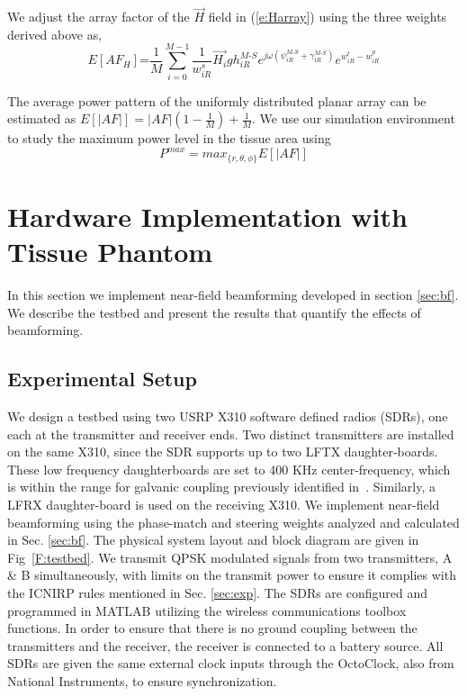 We adjust the array factor of the $\overrightarrow{H}$ field in (\ref{e:Harray}) using the three weights derived above as, 
\begin{equation}\label{e:AFnew}
E[AF_H]\text{=}\frac{1}{M}\sum_{i=0}^{M-1} \frac{1}{w_{iR}^s} \overrightarrow{H_i}gh_{iR}^{M\text{-}S} e^{j\omega \left(\psi_{iR}^{M\text{-}S}+\gamma_{iR}^{M\text{-}S} \right)} e^{w^{t}_{iR} - w_{iR}^p}
\end{equation}

The average power pattern of the uniformly distributed planar array can be estimated as $E[|AF|] = |AF|(1-\frac{1}{M})+\frac{1}{M}$. 
We use our simulation environment to study the maximum power level in the tissue area using 
\begin{equation}\label{e:Pmax}
P^{max}=max_{\{r,\theta,\phi\}}  E[|AF|]
\end{equation}

\section{Hardware Implementation with Tissue Phantom}
\label{sec:implement}
In this section we implement near-field beamforming developed in section \ref{sec:bf}. We describe the testbed and present the results that quantify the effects of beamforming. 
\subsection{Experimental Setup}

We design a testbed using two USRP X310 software defined radios (SDRs), one each at the transmitter and receiver ends. Two distinct transmitters are installed on the same X310, since the SDR supports up to two LFTX daughter-boards. These low frequency daughterboards are set to 400 KHz center-frequency, which is within the range for galvanic coupling previously identified in~\cite{tbiocas}. Similarly, a LFRX daughter-board is used on the receiving X310. We implement near-field beamforming using the phase-match and steering weights analyzed and calculated in Sec. \ref{sec:bf}. The physical system layout and block diagram are given in Fig~\ref{F:testbed}. We transmit QPSK modulated signals from two transmitters, A \& B simultaneously, with limits on the transmit power to ensure it complies with the ICNIRP rules mentioned in Sec. \ref{sec:exp}.
The SDRs are configured and programmed in MATLAB utilizing the wireless communications toolbox functions.
In order to ensure that there is no ground coupling between the transmitters and the receiver, the receiver is connected to a battery source. All SDRs are given the same external clock inputs through the  OctoClock, also from National Instruments, to ensure synchronization.

